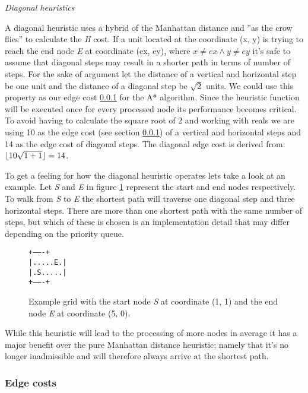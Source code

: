 \documentclass[12pt, a4paper]{article}
\DeclarePairedDelimiter{\floor}{\lfloor}{\rfloor}
\begin{document}
\textit{Diagonal heuristics}

A diagonal heuristic uses a hybrid of the Manhattan distance and ''as the crow
flies'' to calculate the \textit{H} cost. If a unit located at the coordinate
(x, y) is trying to reach the end node \textit{E} at coordinate (ex, ey), where
$ x \ne ex \land y \ne ey $ it's safe to assume that diagonal steps may result
in a shorter path in terms of number of steps. For the sake of argument let the
distance of a vertical and horizontal step be one unit and the distance of a
diagonal step be $ \sqrt{2} $ units. We could use this property as our edge cost
\ref{Edge costs} for the A* algorithm. Since the heuristic function will be
executed once for every processed node its performance becomes critical. To
avoid having to calculate the square root of 2 and working with reals we are
using 10 as the edge cost (see section \ref{Edge costs}) of a vertical and
horizontal steps and 14 as the edge cost of diagonal steps. The diagonal edge
cost is derived from: $ \floor{10 \sqrt{1+1}} = 14 $.

To get a feeling for how the diagonal heuristic operates lets take a look at an
example. Let \textit{S} and \textit{E} in figure \ref{fig:grid} represent the
start and end nodes respectively. To walk from \textit{S} to \textit{E} the
shortest path will traverse one diagonal step and three horizontal steps. There
are more than one shortest path with the same number of steps, but which of
these is chosen is an implementation detail that may differ depending on the
priority queue.

\begin{figure}[htbp]
	\centering
	\texttt{+-------+ \\
|.....E.| \\
|.S.....| \\
+-------+}
	\caption{\label{fig:grid} Example grid with the start node \textit{S} at
	coordinate (1, 1) and the end node \textit{E} at coordinate (5, 0).}
\end{figure}

While this heuristic will lead to the processing of more nodes in average it has
a major benefit over the pure Manhattan distance heuristic; namely that it's no
longer inadmissible and will therefore always arrive at the shortest path.


\subsubsection{Edge costs}
\label{Edge costs}
\end{document}
